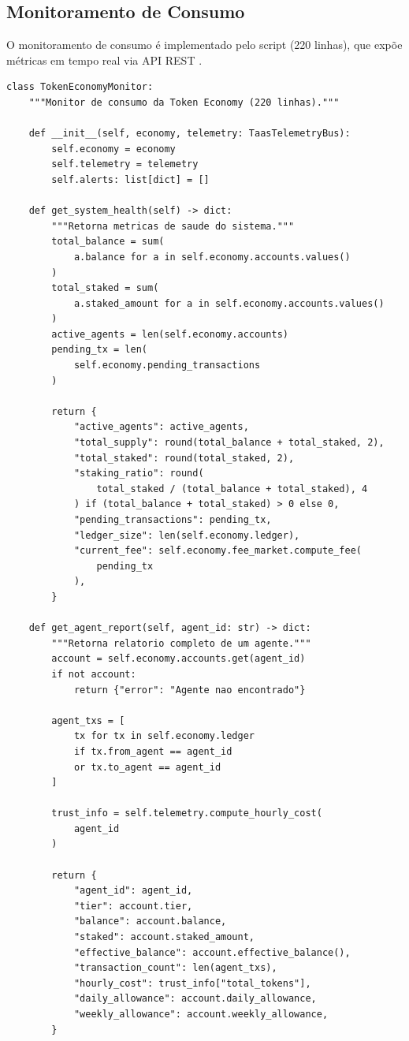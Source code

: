 \subsection{Monitoramento de Consumo}

O monitoramento de consumo é implementado pelo script
 (220 linhas), que expõe
métricas em tempo real via API REST \cite{opencode2026token}.

\begin{lstlisting}[caption={Monitor de consumo da Token Economy},
                  label={lst:token-monitor}]
class TokenEconomyMonitor:
    """Monitor de consumo da Token Economy (220 linhas)."""

    def __init__(self, economy, telemetry: TaasTelemetryBus):
        self.economy = economy
        self.telemetry = telemetry
        self.alerts: list[dict] = []

    def get_system_health(self) -> dict:
        """Retorna metricas de saude do sistema."""
        total_balance = sum(
            a.balance for a in self.economy.accounts.values()
        )
        total_staked = sum(
            a.staked_amount for a in self.economy.accounts.values()
        )
        active_agents = len(self.economy.accounts)
        pending_tx = len(
            self.economy.pending_transactions
        )

        return {
            "active_agents": active_agents,
            "total_supply": round(total_balance + total_staked, 2),
            "total_staked": round(total_staked, 2),
            "staking_ratio": round(
                total_staked / (total_balance + total_staked), 4
            ) if (total_balance + total_staked) > 0 else 0,
            "pending_transactions": pending_tx,
            "ledger_size": len(self.economy.ledger),
            "current_fee": self.economy.fee_market.compute_fee(
                pending_tx
            ),
        }

    def get_agent_report(self, agent_id: str) -> dict:
        """Retorna relatorio completo de um agente."""
        account = self.economy.accounts.get(agent_id)
        if not account:
            return {"error": "Agente nao encontrado"}

        agent_txs = [
            tx for tx in self.economy.ledger
            if tx.from_agent == agent_id
            or tx.to_agent == agent_id
        ]

        trust_info = self.telemetry.compute_hourly_cost(
            agent_id
        )

        return {
            "agent_id": agent_id,
            "tier": account.tier,
            "balance": account.balance,
            "staked": account.staked_amount,
            "effective_balance": account.effective_balance(),
            "transaction_count": len(agent_txs),
            "hourly_cost": trust_info["total_tokens"],
            "daily_allowance": account.daily_allowance,
            "weekly_allowance": account.weekly_allowance,
        }
\end{lstlisting}


